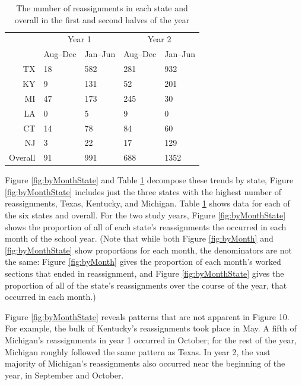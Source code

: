 \documentclass[12pt]{article}\usepackage[]{graphicx}\usepackage[]{color}
\begin{document}
\begin{table}
  \centering
  \begin{tabular}{rll|ll}
    &\multicolumn{2}{c}{Year 1}&\multicolumn{2}{c}{Year 2}\\
    &Aug--Dec&Jan--Jun&Aug--Dec&Jan--Jun\\
 TX &  18 & 582 & 281 & 932 \\ 
  KY &   9 & 131 &  52 & 201 \\ 
  MI &  47 & 173 & 245 &  30 \\ 
  LA &   0 &   5 &   9 &   0 \\ 
  CT &  14 &  78 &  84 &  60 \\ 
  NJ &   3 &  22 &  17 & 129 \\ 
   \hline
Overall &  91 & 991 & 688 & 1352 \\ 
  
\hline
\end{tabular}
\caption{The number of reassignments in each state and overall in the
  first and second halves of the year}
\label{tab:byMonth}
\end{table}

Figure \ref{fig:byMonthState} and Table \ref{tab:byMonth} decompose
these trends by state, Figure \ref{fig:byMonthState} includes just
the three states with the highest number of reassignments, Texas,
Kentucky, and Michigan. Table \ref{tab:byMonth} shows data for each of
the six states and overall.
For the two study years, Figure \ref{fig:byMonthState} shows the proportion of all of each
state's reassignments the occurred in each month of the school year.
(Note that while both Figure \ref{fig:byMonth} and \ref{fig:byMonthState}
show proportions for each month, the denominators are not the same:
Figure \ref{fig:byMonth} gives the proportion of each month's worked
sections that ended in reassignment, and Figure \ref{fig:byMonthState}
gives the proportion of all of the state's reassignments over the
course of the year, that occurred in each month.)

Figure \ref{fig:byMonthState} reveals patterns that are not apparent
in Figure 10.
For example, the bulk of Kentucky's reassignments took place in May.
A fifth of Michigan's reassignments in year 1 occurred in October;
for the rest of the year, Michigan roughly followed the same pattern as Texas.
In year 2, the vast majority of Michigan's reassignments also occurred near
the beginning of the year, in September and October.
\end{document}

